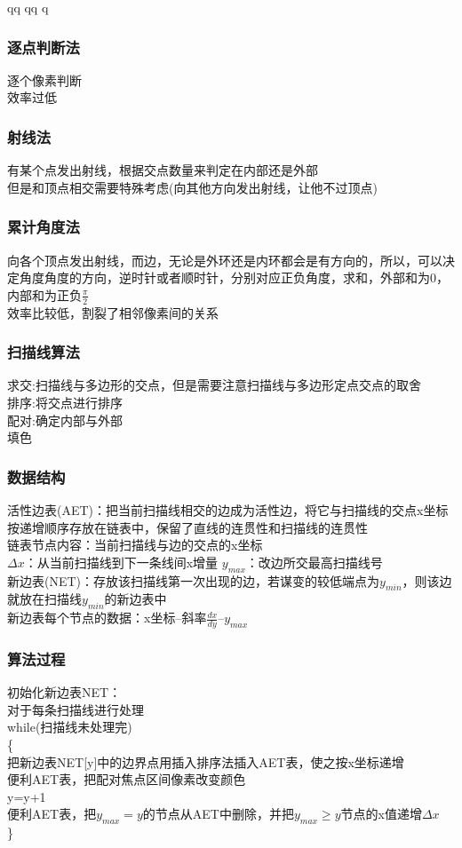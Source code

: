 qq	qq	q                                                                                                                                                                                                                                                                                      \documentclass{article}
\begin{document}
\begin{CJK}{UTF8}{gbsn}
	\subsubsection{逐点判断法}
	逐个像素判断\\
	效率过低\\
	\subsubsection{射线法}
	有某个点发出射线，根据交点数量来判定在内部还是外部\\
	但是和顶点相交需要特殊考虑(向其他方向发出射线，让他不过顶点)\\
		\subsubsection{累计角度法}
		向各个顶点发出射线，而边，无论是外环还是内环都会是有方向的，所以，可以决定角度角度的方向，逆时针或者顺时针，分别对应正负角度，求和，外部和为0，内部和为正负$\frac{\pi}{2}$\\
		效率比较低，割裂了相邻像素间的关系\\
	\subsubsection{扫描线算法}
	求交:扫描线与多边形的交点，但是需要注意扫描线与多边形定点交点的取舍\\
	排序:将交点进行排序\\
	配对:确定内部与外部\\
	填色
	\subsubsection*{数据结构}
	活性边表(AET)：把当前扫描线相交的边成为活性边，将它与扫描线的交点x坐标按递增顺序存放在链表中，保留了直线的连贯性和扫描线的连贯性\\
	链表节点内容：当前扫描线与边的交点的x坐标\\
	$\Delta x$：从当前扫描线到下一条线间x增量
	$y_{max}$：改边所交最高扫描线号\\
	新边表(NET)：存放该扫描线第一次出现的边，若谋变的较低端点为$y_{min}$，则该边就放在扫描线$y_{min}$的新边表中\\
	新边表每个节点的数据：x坐标--斜率$\frac{dx}{dy}$--$y_{max}$\\
	\subsubsection*{算法过程}
	初始化新边表NET：\\
	对于每条扫描线进行处理\\
	while(扫描线未处理完)\\
	\{\\
	把新边表NET[y]中的边界点用插入排序法插入AET表，使之按x坐标递增\\
	便利AET表，把配对焦点区间像素改变颜色\\
	y=y+1\\
	便利AET表，把$y_{max}=y$的节点从AET中删除，并把$y_{max}\ge y$节点的x值递增$\Delta x$\\
	\}\\

\end{CJK}
\end{document}
